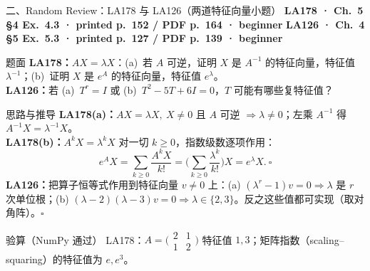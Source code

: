 \documentclass[aspectratio=169,10pt,fontset=none]{ctexbeamer}
\newcommand{\ex}[1]{\textcolor{accent}{\footnotesize\bfseries #1}}
\begin{document}
\begin{frame}[t]{二、Random Review：LA178 与 LA126（两道特征向量小题）}
  \leavevmode\ex{LA178 · Ch.~5 §4 Ex.~4.3 · printed p.~152 / PDF p.~164 · beginner}\quad
  \ex{LA126 · Ch.~4 §5 Ex.~5.3 · printed p.~127 / PDF p.~139 · beginner}
  \begin{block}{\footnotesize 题面}
    \scriptsize \textbf{LA178：}$AX=\lambda X$：(a)~若 $A$ 可逆，证明 $X$ 是 $A^{-1}$ 的特征向量，特征值 $\lambda^{-1}$；(b)~证明 $X$ 是 $e^A$ 的特征向量，特征值 $e^\lambda$。\\
    \textbf{LA126：}若 (a)~$T^r=I$ 或 (b)~$T^2-5T+6I=0$，$T$ 可能有哪些复特征值？
  \end{block}
  \begin{exampleblock}{\footnotesize 思路与推导}
    \scriptsize
    \textbf{LA178(a)：}$AX=\lambda X,\ X\ne0$ 且 $A$ 可逆 $\Rightarrow\lambda\ne0$；左乘 $A^{-1}$ 得 $A^{-1}X=\lambda^{-1}X$。\\
    \textbf{LA178(b)：}$A^kX=\lambda^kX$ 对一切 $k\ge0$，指数级数逐项作用：
    $$e^AX=\sum_{k\ge0}\frac{A^kX}{k!}=\Big(\sum_{k\ge0}\frac{\lambda^k}{k!}\Big)X=e^\lambda X.\ \square$$
    \textbf{LA126：}把算子恒等式作用到特征向量 $v\ne0$ 上：(a) $(\lambda^r-1)v=0\Rightarrow\lambda$ 是 $r$ 次单位根；(b) $(\lambda-2)(\lambda-3)v=0\Rightarrow\lambda\in\{2,3\}$。反之这些值都可实现（取对角阵）。$\square$
  \end{exampleblock}
  \begin{block}{\footnotesize 验算（NumPy 通过）}
    \scriptsize LA178：$A=\bigl(\begin{smallmatrix}2&1\\1&2\end{smallmatrix}\bigr)$ 特征值 $1,3$；矩阵指数（scaling--squaring）的特征值为 $e,e^3$。
  \end{block}
\end{frame}
\end{document}
